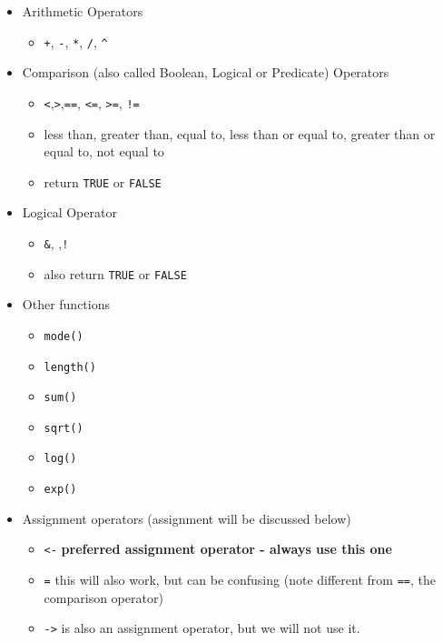 \documentclass[
]{book}
\providecommand{\tightlist}{%
  \setlength{\itemsep}{0pt}\setlength{\parskip}{0pt}}
\begin{document}
\begin{itemize}
\tightlist
\item
  Arithmetic Operators

  \begin{itemize}
  \tightlist
  \item
    \texttt{+}, \texttt{-}, \texttt{*}, \texttt{/}, \texttt{\^{}}
  \end{itemize}
\item
  Comparison (also called Boolean, Logical or Predicate) Operators

  \begin{itemize}
  \tightlist
  \item
    \texttt{\textless{}},\texttt{\textgreater{}},\texttt{==}, \texttt{\textless{}=}, \texttt{\textgreater{}=}, \texttt{!=}
  \item
    less than, greater than, equal to, less than or equal to, greater than or equal to, not equal to
  \item
    return \texttt{TRUE} or \texttt{FALSE}
  \end{itemize}
\item
  Logical Operator

  \begin{itemize}
  \tightlist
  \item
    \texttt{\&}, \texttt{\textbar{}} ,\texttt{!}
  \item
    also return \texttt{TRUE} or \texttt{FALSE}
  \end{itemize}
\item
  Other functions

  \begin{itemize}
  \tightlist
  \item
    \texttt{mode()}
  \item
    \texttt{length()}
  \item
    \texttt{sum()}
  \item
    \texttt{sqrt()}
  \item
    \texttt{log()}
  \item
    \texttt{exp()}
  \end{itemize}
\item
  Assignment operators (assignment will be discussed below)

  \begin{itemize}
  \tightlist
  \item
    \texttt{\textless{}-} \textbf{preferred assignment operator - always use this one}
  \item
    \texttt{=} this will also work, but can be confusing (note different from \texttt{==}, the comparison operator)
  \item
    \texttt{-\textgreater{}} is also an assignment operator, but we will not use it.
  \end{itemize}
\end{itemize}
\end{document}
